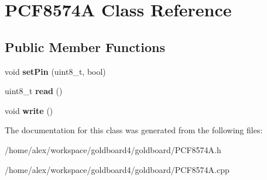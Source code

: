 \hypertarget{class_p_c_f8574_a}{}\section{P\+C\+F8574A Class Reference}
\label{class_p_c_f8574_a}
\subsection*{Public Member Functions}
\begin{DoxyCompactItemize}
\item 
void {\bfseries set\+Pin} (uint8\+\_\+t, bool)\hypertarget{class_p_c_f8574_a_a8612893eb323b38c8c31fb1e415b9eff}{}\label{class_p_c_f8574_a_a8612893eb323b38c8c31fb1e415b9eff}

\item 
uint8\+\_\+t {\bfseries read} ()\hypertarget{class_p_c_f8574_a_ab8bbb865bc98e8f4c2fdc5b30d81df43}{}\label{class_p_c_f8574_a_ab8bbb865bc98e8f4c2fdc5b30d81df43}

\item 
void {\bfseries write} ()\hypertarget{class_p_c_f8574_a_ab462fef7ab449d66c921913c7b5608e4}{}\label{class_p_c_f8574_a_ab462fef7ab449d66c921913c7b5608e4}

\end{DoxyCompactItemize}


The documentation for this class was generated from the following files\+:\begin{DoxyCompactItemize}
\item 
/home/alex/workspace/goldboard4/goldboard/P\+C\+F8574\+A.\+h\item 
/home/alex/workspace/goldboard4/goldboard/P\+C\+F8574\+A.\+cpp\end{DoxyCompactItemize}
